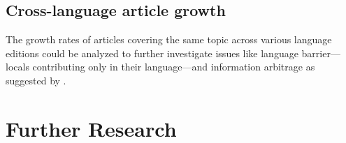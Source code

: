 \subsection{Cross-language article growth}
The growth rates of articles covering the same topic across various language editions could be analyzed to further investigate issues like language barrier---locals contributing only in their language---and information arbitrage as suggested by \textcite{adar2009information}.

\section{Further Research}
